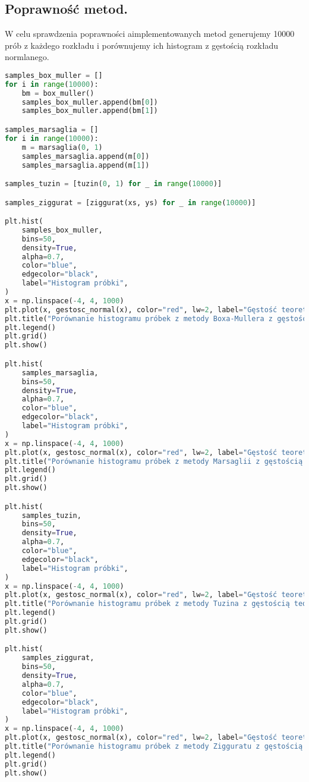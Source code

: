\documentclass[12pt,letterpaper]{article}
\theoremstyle{definition}
\begin{document}
\subsection{Poprawność metod.}
W celu sprawdzenia poprawności aimplementowanych metod generujemy 10000 prób z każdego rozkładu i porównujemy ich histogram z gęstością rozkładu normlanego.
\begin{lstlisting}[language=Python, caption=Sprawdzenie poprawności metod]
samples_box_muller = []
for i in range(10000):
    bm = box_muller()
    samples_box_muller.append(bm[0])
    samples_box_muller.append(bm[1])

samples_marsaglia = []
for i in range(10000):
    m = marsaglia(0, 1)
    samples_marsaglia.append(m[0])
    samples_marsaglia.append(m[1])

samples_tuzin = [tuzin(0, 1) for _ in range(10000)]

samples_ziggurat = [ziggurat(xs, ys) for _ in range(10000)]

plt.hist(
    samples_box_muller,
    bins=50,
    density=True,
    alpha=0.7,
    color="blue",
    edgecolor="black",
    label="Histogram próbki",
)
x = np.linspace(-4, 4, 1000)
plt.plot(x, gestosc_normal(x), color="red", lw=2, label="Gęstość teoretyczna")
plt.title("Porównanie histogramu próbek z metody Boxa-Mullera z gęstością teoretyczną")
plt.legend()
plt.grid()
plt.show()

plt.hist(
    samples_marsaglia,
    bins=50,
    density=True,
    alpha=0.7,
    color="blue",
    edgecolor="black",
    label="Histogram próbki",
)
x = np.linspace(-4, 4, 1000)
plt.plot(x, gestosc_normal(x), color="red", lw=2, label="Gęstość teoretyczna")
plt.title("Porównanie histogramu próbek z metody Marsaglii z gęstością teoretyczną")
plt.legend()
plt.grid()
plt.show()

plt.hist(
    samples_tuzin,
    bins=50,
    density=True,
    alpha=0.7,
    color="blue",
    edgecolor="black",
    label="Histogram próbki",
)
x = np.linspace(-4, 4, 1000)
plt.plot(x, gestosc_normal(x), color="red", lw=2, label="Gęstość teoretyczna")
plt.title("Porównanie histogramu próbek z metody Tuzina z gęstością teoretyczną")
plt.legend()
plt.grid()
plt.show()

plt.hist(
    samples_ziggurat,
    bins=50,
    density=True,
    alpha=0.7,
    color="blue",
    edgecolor="black",
    label="Histogram próbki",
)
x = np.linspace(-4, 4, 1000)
plt.plot(x, gestosc_normal(x), color="red", lw=2, label="Gęstość teoretyczna")
plt.title("Porównanie histogramu próbek z metody Zigguratu z gęstością teoretyczną")
plt.legend()
plt.grid()
plt.show()
\end{lstlisting}
\end{document}
